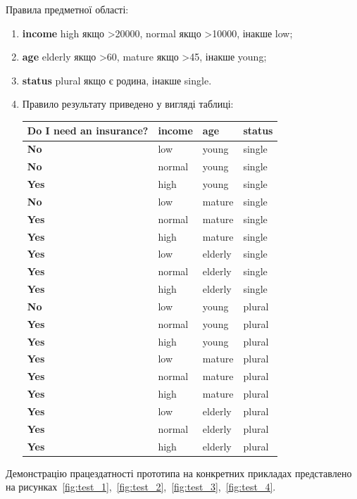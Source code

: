 Правила предметної області:
\begin{enumerate}
	\item \textbf{income} high якщо >20000, normal якщо >10000, інакше low; 
	\item \textbf{age} elderly якщо >60, mature якщо >45, інакше young;
	\item \textbf{status} plural якщо є родина, інакше single.
	\item Правило результату приведено у вигляді таблиці: \\
		\begin{tabular}{l|lll}
			\textbf{Do I need an insurance?} & \textbf{income} & \textbf{age} & \textbf{status} \\\hline 
			\textbf{No} & low & young & single \\ 
			\textbf{No} & normal & young & single \\ 
			\textbf{Yes} & high & young & single \\ 
			\textbf{No} & low & mature & single \\ 
			\textbf{Yes} & normal & mature & single \\ 
			\textbf{Yes} & high & mature & single \\ 
			\textbf{Yes} & low & elderly & single \\ 
			\textbf{Yes} & normal & elderly & single \\ 
			\textbf{Yes} & high & elderly & single \\ 
			\textbf{No} & low & young & plural \\ 
			\textbf{Yes} & normal & young & plural \\ 
			\textbf{Yes} & high & young & plural \\ 
			\textbf{Yes} & low & mature & plural \\ 
			\textbf{Yes} & normal & mature & plural \\ 
			\textbf{Yes} & high & mature & plural \\ 
			\textbf{Yes} & low & elderly & plural \\ 
			\textbf{Yes} & normal & elderly & plural \\ 
			\textbf{Yes} & high & elderly & plural \\ 
		\end{tabular}
\end{enumerate}

Демонстрацію працездатності прототипа на конкретних прикладах представлено на рисунках~\ref{fig:test_1},~\ref{fig:test_2},~\ref{fig:test_3},~\ref{fig:test_4}.

